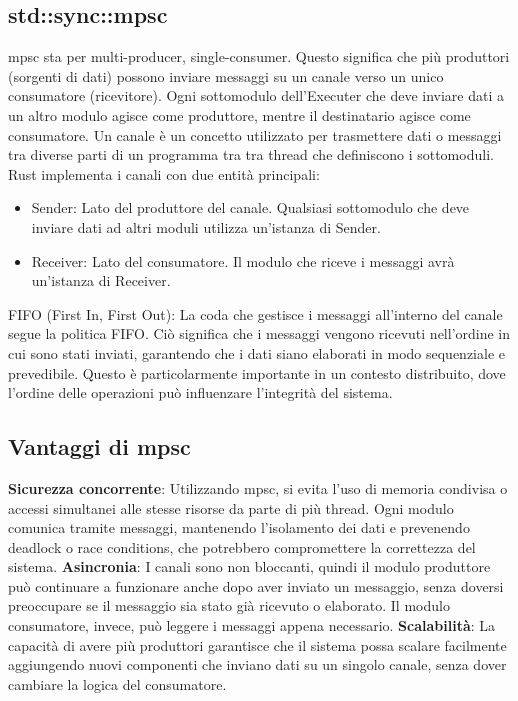 \documentclass[target=bach,aauheader=,style=]{thud}
\begin{document}
\subsection{std::sync::mpsc}
mpsc sta per multi-producer, single-consumer. Questo significa che più produttori (sorgenti di dati) possono inviare messaggi su un canale verso un unico consumatore (ricevitore). Ogni sottomodulo dell'Executer che deve inviare dati a un altro modulo agisce come produttore, mentre il destinatario agisce come consumatore.
Un canale è un concetto utilizzato per trasmettere dati o messaggi tra diverse parti di un programma tra tra thread che definiscono i sottomoduli. Rust implementa i canali con due entità principali:

\begin{itemize}
  \item Sender: Lato del produttore del canale. Qualsiasi sottomodulo che deve inviare dati ad altri moduli utilizza un'istanza di Sender.
  \item Receiver: Lato del consumatore. Il modulo che riceve i messaggi avrà un'istanza di Receiver.
\end{itemize}
FIFO (First In, First Out): La coda che gestisce i messaggi all'interno del canale segue la politica FIFO. Ciò significa che i messaggi vengono ricevuti nell'ordine in cui sono stati inviati, garantendo che i dati siano elaborati in modo sequenziale e prevedibile. Questo è particolarmente importante in un contesto distribuito, dove l'ordine delle operazioni può influenzare l'integrità del sistema.
\subsection{Vantaggi di mpsc}
\textbf{Sicurezza concorrente}: Utilizzando mpsc, si evita l'uso di memoria condivisa o accessi simultanei alle stesse risorse da parte di più thread. Ogni modulo comunica tramite messaggi, mantenendo l'isolamento dei dati e prevenendo deadlock o race conditions, che potrebbero compromettere la correttezza del sistema. 
\newline
\textbf{Asincronia}: I canali sono non bloccanti, quindi il modulo produttore può continuare a funzionare anche dopo aver inviato un messaggio, senza doversi preoccupare se il messaggio sia stato già ricevuto o elaborato. Il modulo consumatore, invece, può leggere i messaggi appena necessario.
\newline
\textbf{Scalabilità}: La capacità di avere più produttori garantisce che il sistema possa scalare facilmente aggiungendo nuovi componenti che inviano dati su un singolo canale, senza dover cambiare la logica del consumatore.
\end{document}
